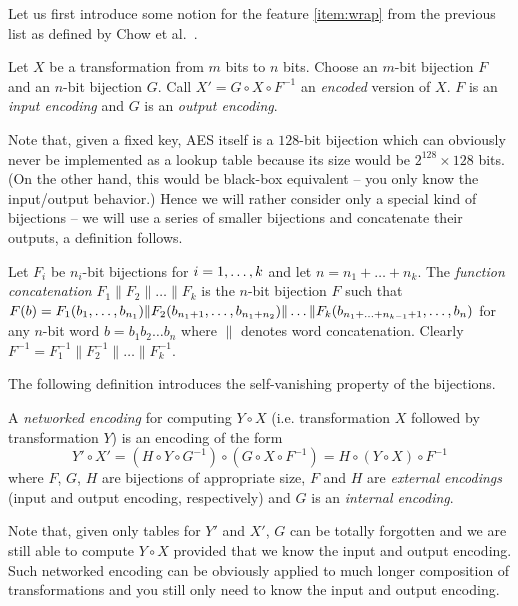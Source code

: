 Let us first introduce some notion for the feature \ref{item:wrap} from the previous list as defined by Chow et al.\ \cite{chow2002aes}.

\begin{defn}[Encoding]
	Let $X$ be a transformation from $m$ bits to $n$ bits. Choose an $m$-bit bijection $F$ and an $n$-bit bijection $G$. Call $X' = G \circ X \circ F^{-1}$ an {\em encoded} version of $X$. $F$ is an {\em input encoding} and $G$ is an {\em output encoding}.
\end{defn}

Note that, given a fixed key, AES itself is a $128$-bit bijection which can obviously never be implemented as a lookup table because its size would be $2^{128}\times 128$ bits. (On the other hand, this would be black-box equivalent -- you only know the input/output behavior.) Hence we will rather consider only a special kind of bijections -- we will use a series of smaller bijections and concatenate their outputs, a definition follows.

\begin{defn}
\label{def:concat}
	Let $F_i$ be $n_i$-bit bijections for $i=1 , \ldots , k$ and let $n = n_1 + \ldots + n_k$. The {\em function concatenation} $F_1 \| F_2 \| \ldots \| F_k$ is the $n$-bit bijection $F$ such that $F(b) = F_1(b_1 , \ldots , b_{n_1})\| F_2(b_{n_1+1} , \ldots , b_{n_1+n_2})\|\ldots\| F_k(b_{n_1+\ldots+n_{k-1}+1} , \ldots , b_n)$ for any $n$-bit word $b=b_1b_2\ldots b_n$ where $\|$ denotes word concatenation. Clearly $F^{-1} = F_1^{-1}\| F_2^{-1}\| \ldots \|F_k^{-1}$.
\end{defn}

The following definition introduces the self-vanishing property of the bijections.

\begin{defn}
\label{def:netw}
	A {\em networked encoding} for computing $Y\circ X$ (i.e. transformation $X$ followed by transformation $Y$) is an encoding of the form
	\[
		Y'\circ X' = (H\circ Y\circ G^{-1})\circ(G\circ X\circ F^{-1}) = H\circ(Y\circ X)\circ F^{-1}
	\]
	where $F$, $G$, $H$ are bijections of appropriate size, $F$ and $H$ are {\em external encodings} (input and output encoding, respectively) and $G$ is an {\em internal encoding}.
\end{defn}

Note that, given only tables for $Y'$ and $X'$, $G$ can be totally forgotten and we are still able to compute $Y\circ X$ provided that we know the input and output encoding. Such networked encoding can be obviously applied to much longer composition of transformations and you still only need to know the input and output encoding.


